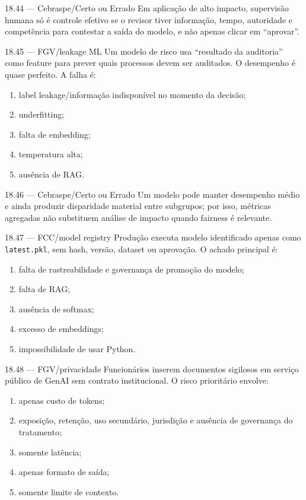 \begin{questao}{ 18.44 — Cebraspe/Certo ou Errado}
Em aplicação de alto impacto, supervisão humana só é controle efetivo se o revisor tiver informação, tempo, autoridade e competência para contestar a saída do modelo, e não apenas clicar em ``aprovar''.
\end{questao}

\begin{questao}{ 18.45 — FGV/leakage ML}
Um modelo de risco usa ``resultado da auditoria'' como feature para prever quais processos devem ser auditados. O desempenho é quase perfeito. A falha é:
\begin{enumerate}[label=\Alph*)]
\item label leakage/informação indisponível no momento da decisão;
\item underfitting;
\item falta de embedding;
\item temperatura alta;
\item ausência de RAG.
\end{enumerate}
\end{questao}

\begin{questao}{ 18.46 — Cebraspe/Certo ou Errado}
Um modelo pode manter desempenho médio e ainda produzir disparidade material entre subgrupos; por isso, métricas agregadas não substituem análise de impacto quando fairness é relevante.
\end{questao}

\begin{questao}{ 18.47 — FCC/model registry}
Produção executa modelo identificado apenas como \texttt{latest.pkl}, sem hash, versão, dataset ou aprovação. O achado principal é:
\begin{enumerate}[label=\Alph*)]
\item falta de rastreabilidade e governança de promoção do modelo;
\item falta de RAG;
\item ausência de softmax;
\item excesso de embeddings;
\item impossibilidade de usar Python.
\end{enumerate}
\end{questao}

\begin{questao}{ 18.48 — FGV/privacidade}
Funcionários inserem documentos sigilosos em serviço público de GenAI sem contrato institucional. O risco prioritário envolve:
\begin{enumerate}[label=\Alph*)]
\item apenas custo de tokens;
\item exposição, retenção, uso secundário, jurisdição e ausência de governança do tratamento;
\item somente latência;
\item apenas formato de saída;
\item somente limite de contexto.
\end{enumerate}
\end{questao}

